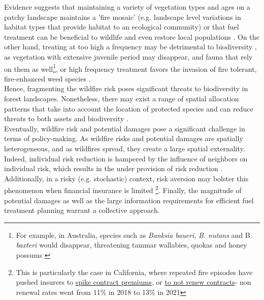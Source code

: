 Evidence suggests that maintaining a variety of vegetation types and ages on a patchy landscape maintains a 'fire mosaic' \citep{Sitters2015} (e.g. landscape level variations in habitat types that provide habitat to an ecological community) or that fuel treatment can be beneficial to wildlife \citep{saab_short-term_2022, loeb_bats_2021} and even restore local populations \citep{Templeton2011}. On the other hand, treating at too high a frequency may be detrimental to biodiversity \citep{bradshaw2018}, as vegetation with extensive juvenile period may disappear, and fauna that rely on them as well\footnote{For example, in Australia, species such as \textit{Banksia baueri}, \textit{B. nutans} and B. \textit{baxteri} would disappear, threatening tammar wallabies, quokas and honey possums \citep{bradshaw2018}}, or high frequency treatment favors the invasion of fire tolerant, fire-enhanced weed species \citep{vanWilgen_fire_2013}. 
%
\\
Hence, fragmenting the wildfire risk poses significant threats to biodiversity in forest landscapes. Nonetheless, there may exist a range of spatial allocation patterns that take into account the location of protected species and can reduce threats to both assets and biodiversity \citep{ager_modeling_2007, king_relative_2008, rachmawati_fuel_2018}. 
\\
\hspace*{1.5em}Eventually, wildfire risk and potential damages pose a significant challenge in terms of policy-making. As wildfire risks and potential damages are spatially heterogeneous, and as wildfires spread, they create a large spatial externality. Indeed, individual risk reduction is hampered by the influence of neighbors on individual risk, which results in the under provision of risk reduction \citep{SHAFRAN2008488, costello_private_2007}. Additionally, in a risky (e.g. stochastic) context, risk aversion may bolster this phenomenon when financial insurance is limited \citep{ehrlich_market_1972}\footnote{This is particularly the case in California, where repeated fire episodes have pushed insurers to \href{https://calmatters.org/economy/2024/05/california-insurance-mitigation/}{spike contract premiums}, or \href{https://www.nbclosangeles.com/news/california-wildfires/state-farm-california-los-angeles-homeowners-insurance-policy/3383583/}{to not renew contracts}- non renewal rates went from 11\% in 2018 to 13\% in 2021}. Finally, the magnitude of potential damages \citep{costello_private_2017} as well as the large information requirements for efficient fuel treatment planning warrant a collective approach.
